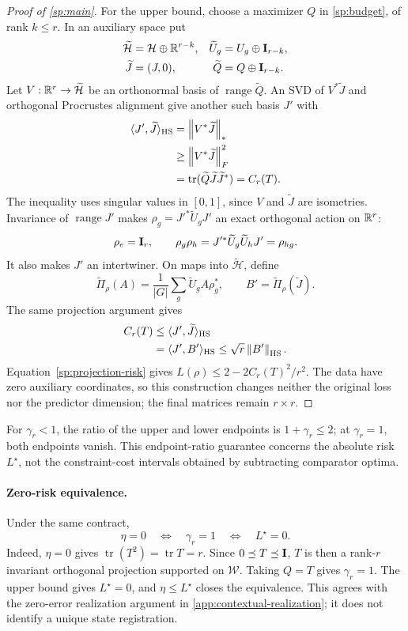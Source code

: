 \begin{proof}[Proof of \cref{sp:main}]
For the upper bound, choose a maximizer $Q$ in \cref{sp:budget}, of rank $k\le r$. In an auxiliary space put
\[
 \begin{aligned}
 \widetilde{\mathcal H}
 &=
 \mathcal H\oplus\mathbb{R}^{r-k},
 &
 \widetilde U_g
 &=
 U_g\oplus\mathbf{I}_{r-k},
 \\
 \widetilde J
 &=
 (J,0),
 &
 \widetilde Q
 &=
 Q\oplus\mathbf{I}_{r-k}.
 \end{aligned}
\]
Let $V:\mathbb{R}^r\to\widetilde{\mathcal H}$ be an orthonormal basis of $\operatorname{range}\widetilde Q$. An SVD of $V^*\widetilde J$ and orthogonal Procrustes alignment give another such basis $J'$ with
\[
 \begin{aligned}
 \langle J',\widetilde J\rangle_{\mathrm{HS}}
 &=
 \left\lVert V^*\widetilde J\right\rVert_*
 \\
 &\ge
 \left\lVert V^*\widetilde J\right\rVert_F^2
 \\
 &=
 \operatorname{tr}
 (\widetilde Q\widetilde J\widetilde J^*)
 =
 C_r(T).
 \end{aligned}
\]
The inequality uses singular values in $[0,1]$, since $V$ and $\widetilde J$ are isometries. Invariance of $\operatorname{range}J'$ makes
$\rho_g=J'^*\widetilde U_gJ'$ an exact orthogonal action on $\mathbb{R}^r$:
\[
 \rho_e=\mathbf{I}_r,\qquad
 \rho_g\rho_h
 =J'^*\widetilde U_g\widetilde U_hJ'
 =\rho_{hg}.
\]
It also makes $J'$ an intertwiner. On maps into $\widetilde{\mathcal H}$, define
\[
 \widetilde\Pi_\rho(A)
 =\frac1{|G|}\sum_g\widetilde U_gA\rho_g^*,
 \qquad B'=\widetilde\Pi_\rho(\widetilde J).
\]
The same projection argument gives
\[
 \begin{aligned}
 C_r(T)
 &\le
 \langle J',\widetilde J\rangle_{\mathrm{HS}}
 \\
 &=
 \langle J',B'\rangle_{\mathrm{HS}}
 \le
 \sqrt r\left\lVert B'\right\rVert_{\mathrm{HS}}.
 \end{aligned}
\]
Equation~\eqref{sp:projection-risk} gives $L(\rho)\le2-2C_r(T)^2/r^2$. The data have zero auxiliary coordinates, so this construction changes neither the original loss nor the predictor dimension; the final matrices remain $r\times r$.
\end{proof}

For $\gamma_r<1$, the ratio of the upper and lower endpoints is $1+\gamma_r\le2$; at $\gamma_r=1$, both endpoints vanish. This endpoint-ratio guarantee concerns the absolute risk $L^\star$, not the constraint-cost intervals obtained by subtracting comparator optima.

\paragraph{Zero-risk equivalence.}
Under the same contract,
\[
 \eta=0\quad\Longleftrightarrow\quad
 \gamma_r=1\quad\Longleftrightarrow\quad L^\star=0.
\]
Indeed, $\eta=0$ gives $\operatorname{tr}(T^2)=\operatorname{tr}T=r$. Since $0\preceq T\preceq\mathbf{I}$, $T$ is then a rank-$r$ invariant orthogonal projection supported on $\mathcal W$. Taking $Q=T$ gives $\gamma_r=1$. The upper bound gives $L^\star=0$, and $\eta\le L^\star$ closes the equivalence. This agrees with the zero-error realization argument in \cref{app:contextual-realization}; it does not identify a unique state registration.

